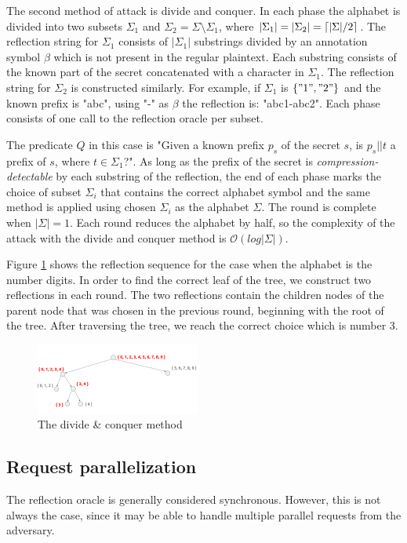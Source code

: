 \documentclass[conference, letterpaper, 10pt]{IEEEtran}
\DeclarePairedDelimiter{\ceil}{\lceil}{\rceil}
\begin{document}
The second method of attack is divide and conquer. In each phase the alphabet is
divided into two subsets $\Sigma_1$ and $\Sigma_2 =
\Sigma
\setminus \Sigma_1$, where $|\Sigma_1| = |\Sigma_2| =
\ceil{|\Sigma| / 2}$. The reflection string for $\Sigma_1$ consists of
$|\Sigma_1|$ substrings divided by an annotation symbol $\beta$ which is not
present in the regular plaintext. Each
substring consists of the known part of the secret concatenated with a character
in $\Sigma_1$. The reflection string for $\Sigma_2$ is constructed
similarly. For example, if $\Sigma_1$ is $\{"1", "2"\}$ and the known prefix is
"abc", using "-" as $\beta$ the reflection is: "abc1-abc2".
Each phase consists of one call to the reflection oracle per subset.

The predicate $Q$ in this case is "Given a known prefix $p_s$ of the secret $s$, is
$p_s || t$ a
prefix of $s$, where $t \in \Sigma_1$?". As long as the prefix of the
secret is \textit{compression-detectable} by each substring of the reflection,
the end of each phase marks the choice of subset $\Sigma_i$ that contains
the correct alphabet symbol and the same method is applied using chosen
$\Sigma_i$ as the alphabet $\Sigma$. The round is complete when
$|\Sigma| = 1$. Each round reduces the alphabet by half, so the complexity
of the attack with the divide and conquer method  is
$\mathcal{O}(log|\Sigma|)$.

Figure \ref{fig:divide_and_conquer} shows the reflection sequence for the case
when the alphabet is the number digits. In order to find the correct leaf of the
tree, we construct two reflections in each round. The two reflections contain
the children nodes of the parent node that was chosen in the previous round,
beginning with the root of the tree. After traversing the tree, we reach the
correct choice which is number 3.

   \begin{figure}[thpb]
      \centering
          \includegraphics[width=0.48\textwidth]{divide_and_conquer.png}
      \caption{The divide \& conquer method}
      \label{fig:divide_and_conquer}
   \end{figure}

\subsection{Request parallelization}\label{subsec:parallel}
The reflection oracle is generally considered synchronous. However, this is not
always the case, since it may be able to handle multiple parallel requests from
the adversary.
\end{document}
